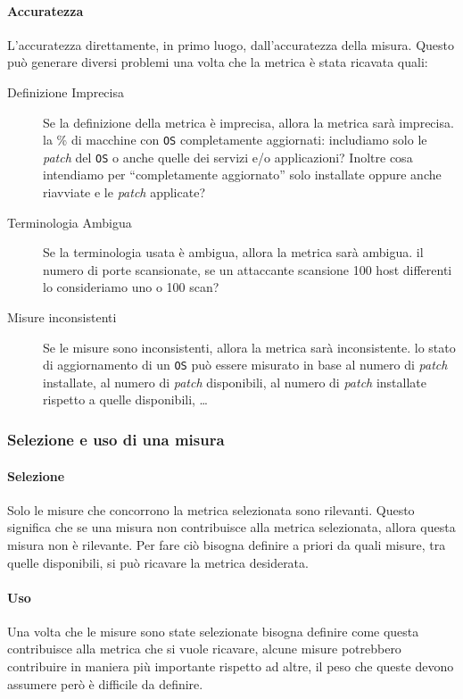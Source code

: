             \paragraph{Accuratezza}
                L'accuratezza direttamente, in primo luogo, dall'accuratezza della misura. Questo può generare diversi problemi una volta che la metrica è stata ricavata quali: \begin{description}
                    \item[Definizione Imprecisa] Se la definizione della metrica è imprecisa, allora la metrica sarà imprecisa.
                        \subitem la \% di macchine con \texttt{OS} completamente aggiornati: includiamo solo le \textit{patch} del \texttt{OS} o anche quelle dei servizi e/o applicazioni? Inoltre cosa intendiamo per ``completamente aggiornato'' solo installate oppure anche riavviate e le \textit{patch} applicate?
                    \item[Terminologia Ambigua] Se la terminologia usata è ambigua, allora la metrica sarà ambigua.
                        \subitem il numero di porte scansionate, se un attaccante scansione 100 host differenti lo consideriamo uno o 100 scan?
                    \item[Misure inconsistenti] Se le misure sono inconsistenti, allora la metrica sarà inconsistente.
                        \subitem lo stato di aggiornamento di un \texttt{OS} può essere misurato in base al numero di \textit{patch} installate, al numero di \textit{patch} disponibili, al numero di \textit{patch} installate rispetto a quelle disponibili, \dots
                \end{description}
        \subsubsection{Selezione e uso di una misura}
            \paragraph{Selezione} Solo le misure che concorrono la metrica selezionata sono rilevanti. Questo significa che se una misura non contribuisce alla metrica selezionata, allora questa misura non è rilevante. Per fare ciò bisogna definire a priori da quali misure, tra quelle disponibili, si può ricavare la metrica desiderata.
            \paragraph{Uso} Una volta che le misure sono state selezionate bisogna definire come questa contribuisce alla metrica che si vuole ricavare, alcune misure potrebbero contribuire in maniera più importante rispetto ad altre, il peso che queste devono assumere però è difficile da definire.
